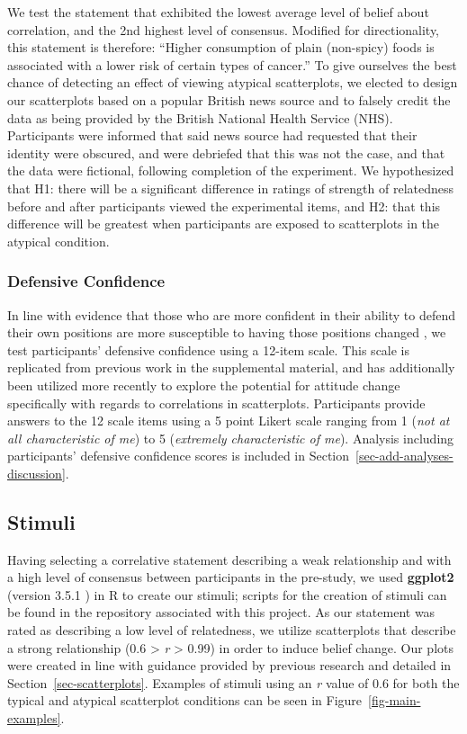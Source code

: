\documentclass[manuscript,screen,review,anonymous]{acmart}
\begin{document}
We test the statement that exhibited the lowest average level of belief
about correlation, and the 2nd highest level of consensus. Modified for
directionality, this statement is therefore: ``Higher consumption of
plain (non-spicy) foods is associated with a lower risk of certain types
of cancer.'' To give ourselves the best chance of detecting an effect of
viewing atypical scatterplots, we elected to design our scatterplots
based on a popular British news source and to falsely credit the data as
being provided by the British National Health Service (NHS).
Participants were informed that said news source had requested that
their identity were obscured, and were debriefed that this was not the
case, and that the data were fictional, following completion of the
experiment. We hypothesized that H1: there will be a significant
difference in ratings of strength of relatedness before and after
participants viewed the experimental items, and H2: that this difference
will be greatest when participants are exposed to scatterplots in the
atypical condition.

\subsubsection{Defensive Confidence}\label{sec-def-con}

In line with evidence that those who are more confident in their ability
to defend their own positions are more susceptible to having those
positions changed \citep{albarracin_2004}, we test participants'
defensive confidence using a 12-item scale. This scale is replicated
from previous work in the supplemental material, and has additionally
been utilized more recently \citep{markant_2023} to explore the
potential for attitude change specifically with regards to correlations
in scatterplots. Participants provide answers to the 12 scale items
using a 5 point Likert scale ranging from 1 (\emph{not at all
characteristic of me}) to 5 (\emph{extremely characteristic of me}).
Analysis including participants' defensive confidence scores is included
in Section~\ref{sec-add-analyses-discussion}.

\subsection{Stimuli}\label{sec-stimuli-main}

Having selecting a correlative statement describing a weak relationship
and with a high level of consensus between participants in the
pre-study, we used \textbf{ggplot2} (version 3.5.1 \citep{ggplot}) in R
to create our stimuli; scripts for the creation of stimuli can be found
in the repository associated with this project. As our statement was
rated as describing a low level of relatedness, we utilize scatterplots
that describe a strong relationship (0.6 \textgreater{} \emph{r}
\textgreater{} 0.99) in order to induce belief change. Our plots were
created in line with guidance provided by previous research and detailed
in Section~\ref{sec-scatterplots}. Examples of stimuli using an \emph{r}
value of 0.6 for both the typical and atypical scatterplot conditions
can be seen in Figure~\ref{fig-main-examples}.
\end{document}
